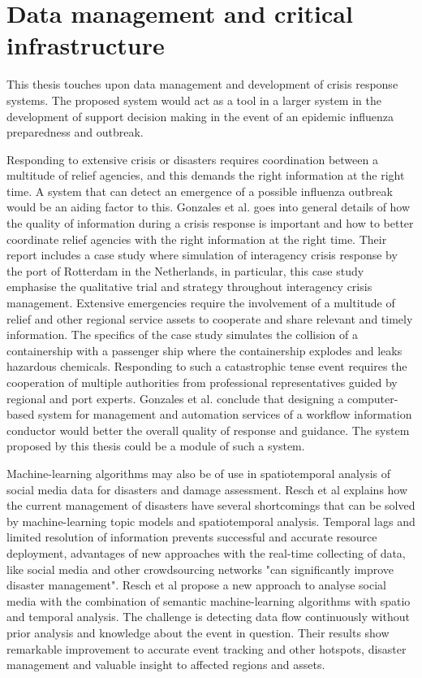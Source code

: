 \section{Data management and critical infrastructure}
This thesis touches upon data management and development of crisis response systems. The proposed system would act as a tool in a larger system in the development of support decision making in the event of an epidemic influenza preparedness and outbreak. 

Responding to extensive crisis or disasters requires coordination between a multitude of relief agencies, and this demands the right information at the right time. A system that can detect an emergence of a possible influenza outbreak would be an aiding factor to this. Gonzales et al. \cite{gonzalez2009framework} goes into general details of how the quality of information during a crisis response is important and how to better coordinate relief agencies with the right information at the right time. Their report includes a case study where simulation of interagency crisis response by the port of Rotterdam in the Netherlands, in particular, this case study emphasise the qualitative trial and strategy throughout interagency crisis management. Extensive emergencies require the involvement of a multitude of relief and other regional service assets to cooperate and share relevant and timely information. The specifics of the case study simulates the collision of a containership with a passenger ship where the containership explodes and leaks hazardous chemicals. Responding to such a catastrophic tense event requires the cooperation of multiple authorities from professional representatives guided by regional and port experts. Gonzales et al. conclude that designing a computer-based system for management and automation services of a workflow information conductor would better the overall quality of response and guidance. The system proposed by this thesis could be a module of such a system. 

Machine-learning algorithms may also be of use in spatiotemporal analysis of social media data for disasters and damage assessment. Resch et al \cite{resch2018combining} explains how the current management of disasters have several shortcomings that can be solved by machine-learning topic models and spatiotemporal analysis. Temporal lags and limited resolution of information prevents successful and accurate resource deployment, advantages of new approaches with the real-time collecting of data, like social media and other crowdsourcing networks "can significantly improve disaster management". Resch et al propose a new approach to analyse social media with the combination of semantic machine-learning algorithms with spatio and temporal analysis. The challenge is detecting data flow continuously without prior analysis and knowledge about the event in question. Their results show remarkable improvement to accurate event tracking and other hotspots, disaster management and valuable insight to affected regions and assets.


